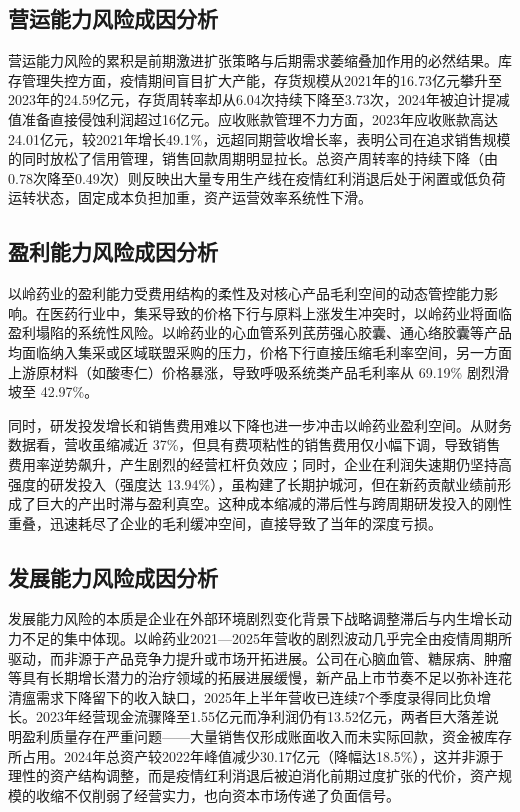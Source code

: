 \documentclass[12pt,a4paper,fontset=windows,UTF8]{ctexart}
\begin{document}
\subsection{营运能力风险成因分析}
营运能力风险的累积是前期激进扩张策略与后期需求萎缩叠加作用的必然结果。库存管理失控方面，疫情期间盲目扩大产能，存货规模从2021年的16.73亿元攀升至2023年的24.59亿元，存货周转率却从6.04次持续下降至3.73次，2024年被迫计提减值准备直接侵蚀利润超过16亿元。应收账款管理不力方面，2023年应收账款高达24.01亿元，较2021年增长49.1\%，远超同期营收增长率，表明公司在追求销售规模的同时放松了信用管理，销售回款周期明显拉长。总资产周转率的持续下降（由0.78次降至0.49次）则反映出大量专用生产线在疫情红利消退后处于闲置或低负荷运转状态，固定成本负担加重，资产运营效率系统性下滑。

\subsection{盈利能力风险成因分析}
以岭药业的盈利能力受费用结构的柔性及对核心产品毛利空间的动态管控能力影响。在医药行业中，集采导致的价格下行与原料上涨发生冲突时，以岭药业将面临盈利塌陷的系统性风险。以岭药业的心血管系列芪苈强心胶囊、通心络胶囊等产品均面临纳入集采或区域联盟采购的压力，价格下行直接压缩毛利率空间，另一方面上游原材料（如酸枣仁）价格暴涨，导致呼吸系统类产品毛利率从 69.19\% 剧烈滑坡至 42.97\%。

同时，研发投发增长和销售费用难以下降也进一步冲击以岭药业盈利空间。从财务数据看，营收虽缩减近 37\%，但具有费项粘性的销售费用仅小幅下调，导致销售费用率逆势飙升，产生剧烈的经营杠杆负效应；同时，企业在利润失速期仍坚持高强度的研发投入（强度达 13.94\%），虽构建了长期护城河，但在新药贡献业绩前形成了巨大的产出时滞与盈利真空。这种成本缩减的滞后性与跨周期研发投入的刚性重叠，迅速耗尽了企业的毛利缓冲空间，直接导致了当年的深度亏损。

\subsection{发展能力风险成因分析}
发展能力风险的本质是企业在外部环境剧烈变化背景下战略调整滞后与内生增长动力不足的集中体现。以岭药业2021—2025年营收的剧烈波动几乎完全由疫情周期所驱动，而非源于产品竞争力提升或市场开拓进展。公司在心脑血管、糖尿病、肿瘤等具有长期增长潜力的治疗领域的拓展进展缓慢，新产品上市节奏不足以弥补连花清瘟需求下降留下的收入缺口，2025年上半年营收已连续7个季度录得同比负增长。2023年经营现金流骤降至1.55亿元而净利润仍有13.52亿元，两者巨大落差说明盈利质量存在严重问题——大量销售仅形成账面收入而未实际回款，资金被库存所占用。2024年总资产较2022年峰值减少30.17亿元（降幅达18.5\%），这并非源于理性的资产结构调整，而是疫情红利消退后被迫消化前期过度扩张的代价，资产规模的收缩不仅削弱了经营实力，也向资本市场传递了负面信号。
\end{document}
